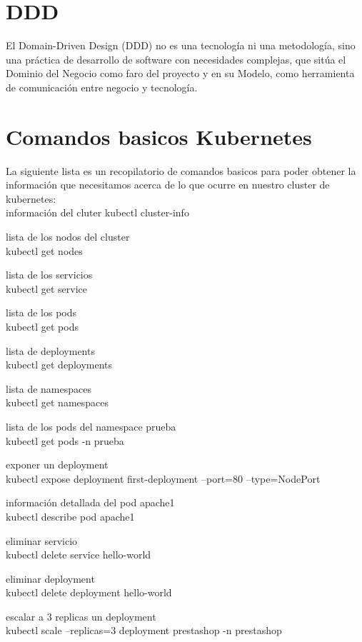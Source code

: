     \section{DDD}  
  El Domain-Driven Design (DDD) no es una tecnología ni una metodología, sino una práctica de desarrollo de software con necesidades complejas, que sitúa el Dominio del Negocio como faro del proyecto y en su Modelo, como herramienta de comunicación entre negocio y tecnología.
  \section{ Comandos basicos Kubernetes}
  La siguiente lista es un recopilatorio de comandos basicos para poder obtener la información que necesitamos acerca de lo que ocurre en nuestro cluster de kubernetes:\\
  información del cluter
  kubectl cluster-info 
  
   lista de los nodos del cluster\\
  kubectl get nodes  
  
   lista de los servicios \\
  kubectl get service 
  
   lista de los pods\\
  kubectl get pods   
  
   lista de deployments \\
  kubectl get deployments 
  
   lista de namespaces\\
  kubectl get namespaces 
  
   lista de los pods del namespace prueba\\
  kubectl get pods -n prueba  
  
   exponer un deployment\\
  kubectl expose deployment first-deployment --port=80 --type=NodePort 
  
   información detallada del pod apache1 \\
  kubectl describe pod apache1  
  
   eliminar servicio\\
  kubectl delete service hello-world  
  
   eliminar deployment\\
  kubectl delete deployment hello-world  
  
   escalar a 3 replicas un deployment\\
  kubectl scale --replicas=3 deployment prestashop -n prestashop
  
